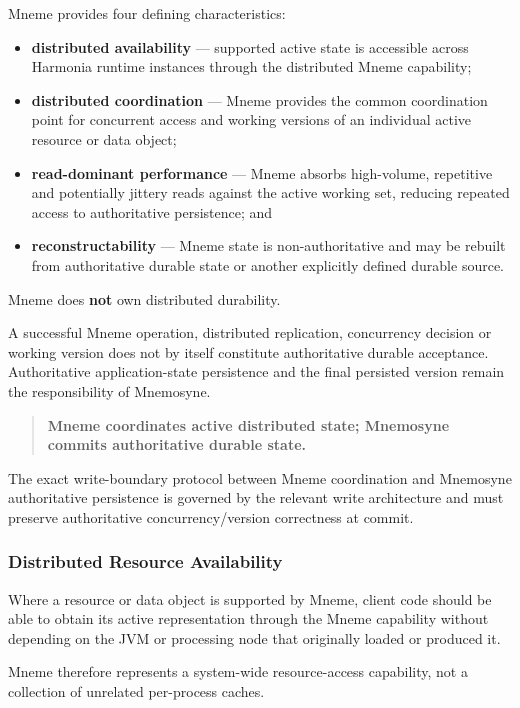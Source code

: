 Mneme provides four defining characteristics:
\begin{itemize}
    \item \textbf{distributed availability} --- supported active state is accessible across Harmonia runtime instances through the distributed Mneme capability;
    \item \textbf{distributed coordination} --- Mneme provides the common coordination point for concurrent access and working versions of an individual active resource or data object;
    \item \textbf{read-dominant performance} --- Mneme absorbs high-volume, repetitive and potentially jittery reads against the active working set, reducing repeated access to authoritative persistence; and
    \item \textbf{reconstructability} --- Mneme state is non-authoritative and may be rebuilt from authoritative durable state or another explicitly defined durable source.
\end{itemize}

Mneme does \textbf{not} own distributed durability.

A successful Mneme operation, distributed replication, concurrency decision or working version does not by itself constitute authoritative durable acceptance. Authoritative application-state persistence and the final persisted version remain the responsibility of Mnemosyne.

\begin{quote}
    \textbf{Mneme coordinates active distributed state; Mnemosyne commits authoritative durable state.}
\end{quote}

The exact write-boundary protocol between Mneme coordination and Mnemosyne authoritative persistence is governed by the relevant write architecture and must preserve authoritative concurrency/version correctness at commit.

\subsubsection{Distributed Resource Availability}

Where a resource or data object is supported by Mneme, client code should be able to obtain its active representation through the Mneme capability without depending on the JVM or processing node that originally loaded or produced it.

Mneme therefore represents a system-wide resource-access capability, not a collection of unrelated per-process caches.

